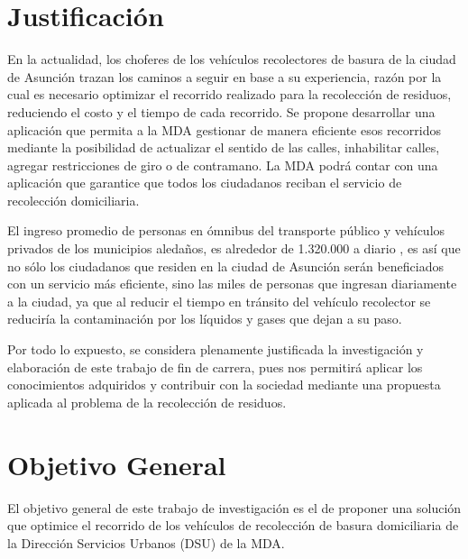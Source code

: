 \section{Justificación}
 En la actualidad, los choferes de los vehículos recolectores de basura de la ciudad de Asunción trazan los caminos a seguir en base a su experiencia, razón por la cual es necesario optimizar el recorrido realizado para la recolección de residuos, reduciendo el costo y el tiempo de cada recorrido. Se propone desarrollar una aplicación que permita a la MDA gestionar de manera eficiente esos recorridos mediante la posibilidad de actualizar el sentido de las calles, inhabilitar calles, agregar restricciones de giro o de contramano. La MDA podrá contar con una aplicación que garantice que todos los ciudadanos reciban el servicio de recolección domiciliaria.

El ingreso promedio de personas en ómnibus del transporte público y vehículos privados de los municipios aledaños, es alrededor de 1.320.000 a diario \citep{DiarioABCColor2016PorColor}, es así que no sólo los ciudadanos que residen en la ciudad de Asunción serán beneficiados con un servicio más eficiente, sino las miles de personas que ingresan diariamente a la ciudad, ya que al reducir el tiempo en tránsito del vehículo recolector se reduciría la contaminación por los líquidos y gases que dejan a su paso.

 
Por todo lo expuesto, se considera plenamente justificada la investigación y elaboración de este trabajo de fin de carrera, pues nos permitirá aplicar los conocimientos adquiridos y contribuir con la sociedad mediante una propuesta aplicada al problema de la recolección de residuos.


\section{Objetivo General}
El objetivo general de este trabajo de investigación es el de proponer una solución que optimice el recorrido de los vehículos de recolección de basura domiciliaria de la Dirección Servicios Urbanos (DSU) de la MDA.

